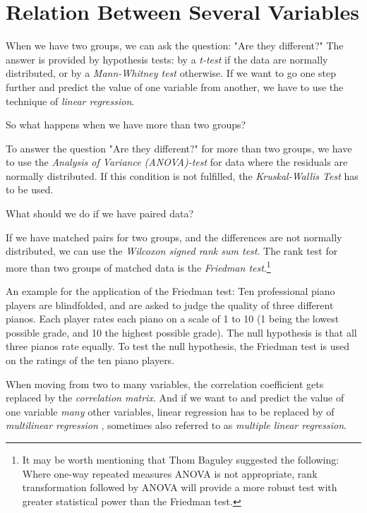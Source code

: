 \chapter{Relation Between Several Variables}

When we have two groups, we can ask the question: "Are they different?" The answer is provided by hypothesis tests: by a \emph{t-test} if the data are normally distributed, or by a \emph{Mann-Whitney test} otherwise. If we want to go one step further and predict the value of one variable from another, we have to use the technique of \emph{linear regression}.

So what happens when we have more than two groups?

To answer the question "Are they different?" for more than two groups, we have to use the \emph{Analysis of Variance (ANOVA)-test} for data where the residuals are normally distributed. If this condition is not fulfilled, the \emph{Kruskal-Wallis Test} has to be used.

What should we do if we have paired data?

If we have matched pairs for two groups, and the differences are not normally distributed, we can use the \emph{Wilcoxon signed rank sum test}. The rank test for more than two groups of matched data is the \emph{Friedman test}.\footnote{It may be worth mentioning that Thom Baguley suggested the following: Where one-way repeated measures ANOVA is not appropriate, rank transformation followed by ANOVA will provide a more robust test with greater statistical power than the Friedman test.}

An example for the application of the Friedman test: Ten professional piano players are blindfolded, and are asked to judge the quality of three different pianos. Each player rates each piano on a scale of 1 to 10 (1 being the lowest possible grade, and 10 the highest possible grade). The null hypothesis is that all three pianos rate equally. To test the null hypothesis, the Friedman test is used on the ratings of the ten piano players.

When moving from two to many variables, the correlation coefficient gets replaced by the \emph{correlation matrix}. And if we want to and predict the value of one variable \emph{many} other variables, linear regression has to be replaced by of \emph{multilinear regression} , sometimes also referred to as \emph{multiple linear regression}.


